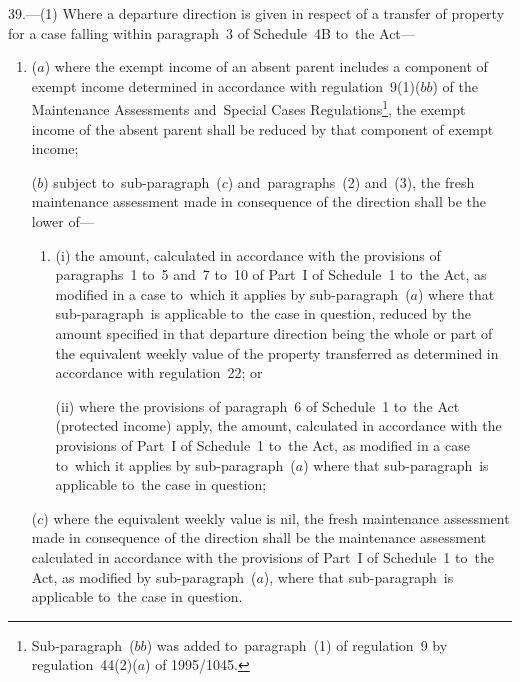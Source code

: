 \documentclass[12pt,a4paper]{article}
\begin{document}
39.—(1)
Where a departure direction is given in respect of a transfer of property for a
case falling within paragraph~3 of Schedule~4B to~the Act—
\begin{enumerate}\item[]
($a$) where the exempt income of an absent parent includes a component of exempt
income determined in accordance with regulation~9(1)($bb$) of the Maintenance
Assessments and~Special Cases Regulations\footnote{\frenchspacing Sub-paragraph~($bb$) was added to~paragraph~(1) of regulation~9 by regulation~44(2)($a$) of 1995/1045.}, the exempt income of the absent
parent shall be reduced by that component of exempt income;


($b$) subject to~sub-paragraph~($c$) and~paragraphs~(2) and~(3), the fresh maintenance assessment made in consequence of the direction shall be the lower of—
\begin{enumerate}\item[]
(i) the amount, calculated in accordance with the provisions of paragraphs~1 to~5 and~7 to~10 of Part~I of Schedule~1 to~the Act, as modified in a case to~which it applies by sub-paragraph~($a$) where that sub-paragraph~is applicable to~the case in question, reduced by the amount specified in that departure direction being the whole or part of the equivalent weekly value of the property transferred as determined in accordance with regulation~22; or

(ii) where the provisions of paragraph~6 of Schedule~1 to~the Act (protected income) apply, the amount, calculated in accordance with the provisions of Part~I of Schedule~1 to~the Act, as modified in a case to~which it applies by sub-paragraph~($a$) where that sub-paragraph~is applicable to~the case in question;
\end{enumerate}

($c$) where the equivalent weekly value is nil, the fresh maintenance assessment
made in consequence of the direction shall be the maintenance assessment
calculated in accordance with the provisions of Part~I of Schedule~1 to~the Act,
as modified by sub-paragraph~($a$), where that sub-paragraph~is applicable to~the
case in question.
\end{enumerate}
\end{document}
